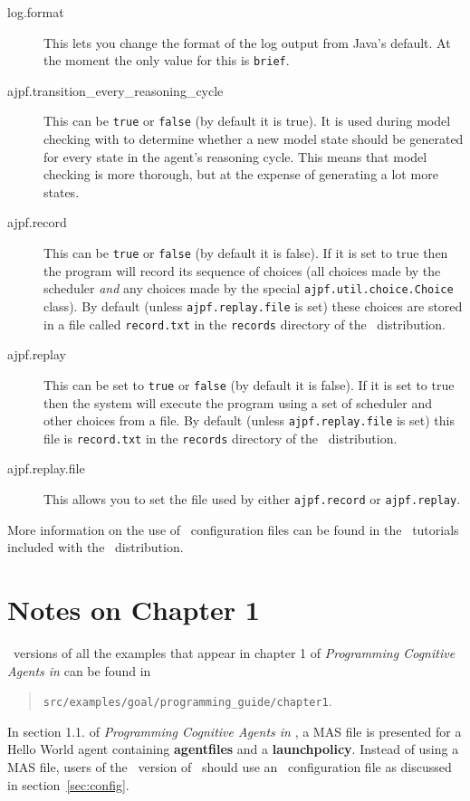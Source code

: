 \documentclass[a4]{article}
\begin{document}
\begin{sloppypar}
\begin{description}
\item[log.format] This lets you change the format of the log output from Java's default.  At the moment the only value for this is \texttt{brief}.
\item[ajpf.transition\_every\_reasoning\_cycle] This can be \texttt{true} or \texttt{false} (by default it is true).  It is used during model checking with \ajpf{} to determine whether a new model state should be generated for every state in the agent's reasoning cycle.  This means that model checking is more thorough, but at the expense of generating a lot more states.
\item[ajpf.record] This can be \texttt{true} or \texttt{false} (by default  it is false).  If it is set to true then the program will record its sequence of choices (all choices made by the scheduler \emph{and} any choices made by the special \texttt{ajpf.util.choice.Choice} class).  By default (unless \texttt{ajpf.replay.file} is set) these choices are stored in a file called \texttt{record.txt} in the \texttt{records} directory of the \mcapl\ distribution.
\item[ajpf.replay] This can be set to \texttt{true} or \texttt{false} (by default it is false).  If it is set to true then the system will execute the program using a set of scheduler and other choices from a file.  By default (unless \texttt{ajpf.replay.file} is set) this  file is  \texttt{record.txt} in the \texttt{records} directory of the \mcapl\ distribution.
\item[ajpf.replay.file] This allows you to set the file used by either \texttt{ajpf.record} or \texttt{ajpf.replay}.
\end{description}
\end{sloppypar}

More information on the use of \ail\ configuration files can be found in the \ail\ tutorials included with the \mcapl\ distribution.

\section{Notes on Chapter 1}

\ail\ versions of all the examples that appear in chapter 1 of \emph{Programming Cognitive Agents in \goal} can be found in
\begin{quote}
  \texttt{src/examples/goal/programming\_guide/chapter1}.
\end{quote}

In section 1.1. of \emph{Programming Cognitive Agents in \goal}, a MAS file is presented for a Hello World agent containing {\bf agentfiles} and a {\bf launchpolicy}.  Instead of using a MAS file, users of the \ail\ version of \goal\ should use an \ail\ configuration file as discussed in section~\ref{sec:config}.
\end{document}
